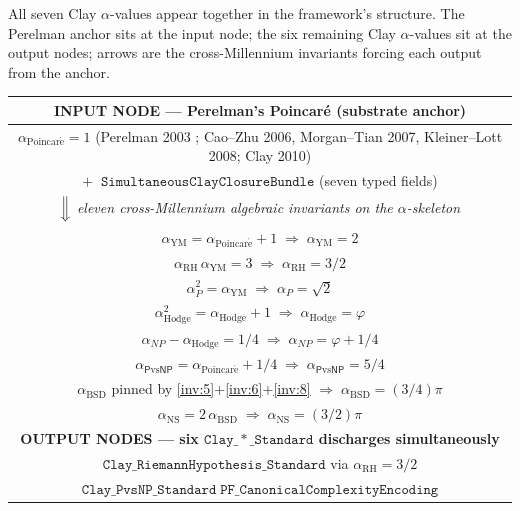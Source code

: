 \documentclass[11pt,a4paper]{article}
\theoremstyle{plain}
\theoremstyle{definition}
\begin{document}
All seven Clay $\alpha$-values appear together in the framework's
structure. The Perelman anchor sits at the input node; the six
remaining Clay $\alpha$-values sit at the output nodes; arrows
are the cross-Millennium invariants forcing each output from the
anchor.

\begin{center}
\renewcommand{\arraystretch}{1.20}
\begin{tabular}{c}
\toprule
\textbf{INPUT NODE --- Perelman's Poincar\'e (substrate anchor)}
  \\
\midrule
$\alpha_{\mathrm{Poincar\acute e}} = 1$
  (Perelman 2003 \cite{perelman2002,perelman2003a,perelman2003b};
   Cao--Zhu 2006, Morgan--Tian 2007, Kleiner--Lott 2008;
   Clay 2010) \\
$+\;\;\mathtt{SimultaneousClayClosureBundle}$
  (seven typed fields) \\
\midrule
$\Big\Downarrow$ \emph{eleven cross-Millennium algebraic invariants
  on the $\alpha$-skeleton} \\[0.3em]
$\alpha_{\mathrm{YM}} = \alpha_{\mathrm{Poincar\acute e}} + 1
  \;\Rightarrow\; \alpha_{\mathrm{YM}} = 2$ \\
$\alpha_{\mathrm{RH}}\,\alpha_{\mathrm{YM}} = 3
  \;\Rightarrow\; \alpha_{\mathrm{RH}} = 3/2$ \\
$\alpha_{P}^{2} = \alpha_{\mathrm{YM}}
  \;\Rightarrow\; \alpha_{P} = \sqrt{2}$ \\
$\alpha_{\mathrm{Hodge}}^{2} = \alpha_{\mathrm{Hodge}} + 1
  \;\Rightarrow\; \alpha_{\mathrm{Hodge}} = \varphi$ \\
$\alpha_{NP} - \alpha_{\mathrm{Hodge}} = 1/4
  \;\Rightarrow\; \alpha_{NP} = \varphi + 1/4$ \\
$\alpha_{\mathsf{P}\mathrm{vs}\mathsf{NP}} =
  \alpha_{\mathrm{Poincar\acute e}} + 1/4
  \;\Rightarrow\;
  \alpha_{\mathsf{P}\mathrm{vs}\mathsf{NP}} = 5/4$ \\
$\alpha_{\mathrm{BSD}}$ pinned by
  \eqref{inv:5}+\eqref{inv:6}+\eqref{inv:8}
  $\Rightarrow\; \alpha_{\mathrm{BSD}} = (3/4)\pi$ \\
$\alpha_{\mathrm{NS}} = 2\,\alpha_{\mathrm{BSD}}
  \;\Rightarrow\; \alpha_{\mathrm{NS}} = (3/2)\pi$ \\
\midrule
\textbf{OUTPUT NODES --- six $\mathtt{Clay\_*\_Standard}$ discharges
  simultaneously} \\
\midrule
$\mathtt{Clay\_RiemannHypothesis\_Standard}$ via
  $\alpha_{\mathrm{RH}} = 3/2$ \\
$\mathtt{Clay\_PvsNP\_Standard\;PF\_CanonicalComplexityEncoding}$

\end{tabular}
\end{center}
\end{document}
